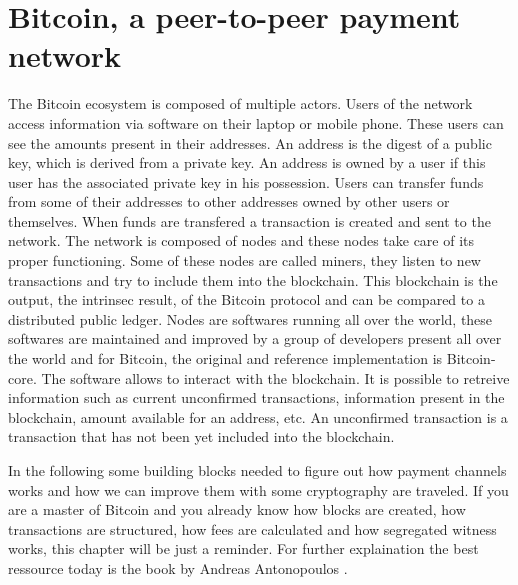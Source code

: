 \chapter{Bitcoin, a peer-to-peer payment network}
\label{chap:bitcoin}

The Bitcoin ecosystem is composed of multiple actors. Users of the network access
information via software on their laptop or mobile phone. These users can see the amounts
present in their addresses. An address is the digest of a public key, which is derived
from a private key. An address is owned by a user if this user
has the associated private key in his possession. Users can transfer funds from some
of their addresses to other addresses owned by other users or themselves. When funds
are transfered a transaction is created and sent to the network. The network is
composed of nodes and these nodes take care of its proper functioning. Some of these
nodes are called miners, they listen to new transactions and try to include them into
the blockchain. This blockchain is the output, the intrinsec result, of the Bitcoin
protocol and can be compared to a distributed public ledger. Nodes are softwares
running all over the world, these softwares are maintained and improved by a group
of developers present all over the world and for Bitcoin, the original and reference
implementation is Bitcoin-core. The software allows to interact with the blockchain.
It is possible to retreive information such as current unconfirmed transactions,
information present in the blockchain, amount available for an address, etc.
An unconfirmed transaction is a transaction that has not been yet included into
the blockchain.

In the following some building blocks needed to figure out how payment channels works
and how we can improve them with some cryptography are traveled. If you are a master
of Bitcoin and you already know how blocks are created, how transactions are structured,
how fees are calculated and how segregated witness works, this chapter will be just
a reminder. For further explaination the best ressource today is the book  by Andreas Antonopoulos \cite{Antonopoulos:2014:MBU:2695500}.


\minitoc

\newpage

